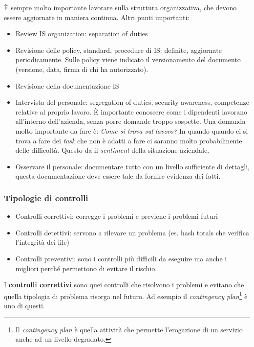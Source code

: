 È sempre molto importante lavorare sulla struttura organizzativa, che devono 
essere aggiornate in maniera continua.
Altri punti importanti:
\begin{itemize}
\item Review IS organization: separation of duties
\item Revisione delle policy, standard, procedure di IS: definite, aggiornate 
periodicamente. Sulle policy viene indicato il versionamento del documento 
(versione, data, firma di chi ha autorizzato).
\item Revisione della documentazione IS
\item Intervista del personale: segregation of duties, security awareness, 
competenze relative al proprio lavoro. È importante conoscere come i dipendenti 
lavorano all'interno dell'azienda, senza porre domande troppo sospette. Una 
domanda molto importante da fare è: \textit{Come si trova sul lavoro?} In quando 
quando ci si trova a fare dei \textit{task} che non è adatti a fare ci saranno 
molto probabilmente delle difficoltà. Questo da il \textit{sentiment} della 
situazione aziendale.
\item Osservare il personale: documentare tutto 
con un livello sufficiente di dettagli, questa documentazione deve essere tale 
da fornire evidenza dei fatti.

\end{itemize}


\subsubsection{Tipologie di controlli}


\begin{itemize}
\item Controlli correttivi: corregge i problemi e previene i problemi futuri
\item Controlli detettivi: servono a rilevare un problema (es. hash totals che 
verifica l'integrità dei file)
\item Controlli preventivi: sono i controlli più difficili da eseguire ma anche 
i migliori perché permettono di evitare il rischio.
\end{itemize}

I \textbf{controlli correttivi} sono quei controlli che risolvono i problemi e 
evitano che quella tipologia di problema risorga nel futuro. Ad esempio il 
\textit{contingency plan}\footnote{Il \textit{contingency plan} è quella 
attività che permette l'erogazione di un servizio anche ad un livello 
degradato.} è uno di questi.

